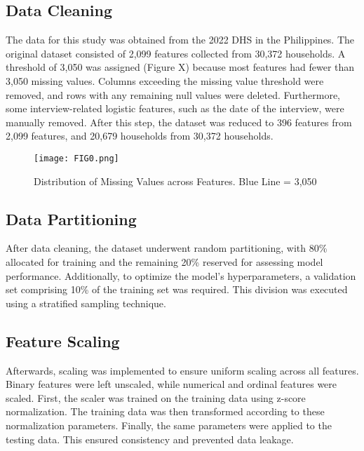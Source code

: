 \documentclass[a4paper,fleqn]{cas-sc}
\begin{document}
\subsection{Data Cleaning}
The data for this study was obtained from the 2022 DHS in the Philippines. The original dataset consisted of 2,099 features collected from 30,372 households. A threshold of 3,050 was assigned (Figure X) because most features had fewer than 3,050 missing values. Columns exceeding the missing value threshold were removed, and rows with any remaining null values were deleted. Furthermore, some interview-related logistic features, such as the date of the interview, were manually removed. After this step, the dataset was reduced to 396 features from 2,099 features, and 20,679 households from 30,372 households.

\begin{figure}[htbp]
    \centering
    \texttt{[image: FIG0.png]} %
    \caption{Distribution of Missing Values across Features. Blue Line = 3,050}
\end{figure}


\subsection{Data Partitioning}
After data cleaning, the dataset underwent random partitioning, with 80\% allocated for training and the remaining 20\% reserved for assessing model performance. Additionally, to optimize the model's hyperparameters, a validation set comprising 10\% of the training set was required. This division was executed using a stratified sampling technique.

\subsection{Feature Scaling}
Afterwards, scaling was implemented to ensure uniform scaling across all features. Binary features were left unscaled, while numerical and ordinal features were scaled. First, the scaler was trained on the training data using z-score normalization. The training data was then transformed according to these normalization parameters. Finally, the same parameters were applied to the testing data. This ensured consistency and prevented data leakage.
\end{document}
